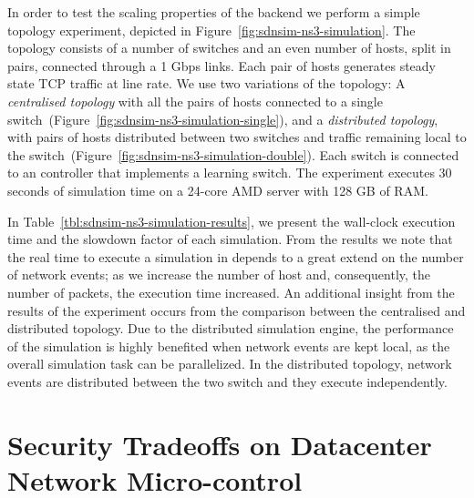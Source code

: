 In order to test the scaling properties of the  backend we perform a
simple topology experiment, depicted in Figure~\ref{fig:sdnsim-ns3-simulation}.
The topology consists of a number of switches and an even number of hosts, split
in pairs, connected through a 1 Gbps links.  Each pair of hosts generates steady
state TCP traffic at line rate.  We use two variations of the topology: A {\it
  centralised topology} with all the pairs of hosts connected to a single
switch~(Figure~\ref{fig:sdnsim-ns3-simulation-single}), and a {\it distributed
  topology}, with pairs of hosts distributed between two switches and traffic
remaining local to the switch~(Figure~\ref{fig:sdnsim-ns3-simulation-double}).
Each switch is connected to an \of controller that implements a learning switch.
The experiment executes 30 seconds of simulation time on a 24-core AMD server
with 128 GB of RAM. 

In Table~\ref{tbl:sdnsim-ns3-simulation-results}, we present the wall-clock
execution time and the slowdown factor of each simulation.  From the results we
note that the real time to execute a simulation in \sdnsim depends to a great
extend on the number of network events; as we increase the number of host and,
consequently, the number of packets, the execution time increased.
An additional insight from the results of the experiment occurs from the
comparison between the centralised and distributed topology. Due to the
distributed simulation engine, the performance of the simulation is highly
benefited when network events are kept local, as the overall simulation task can
be parallelized. In the distributed topology, network events are distributed
between the two switch and they execute independently. 


\section{Security Tradeoffs on Datacenter Network Micro-control} \label{sec:rdsf-eval}

